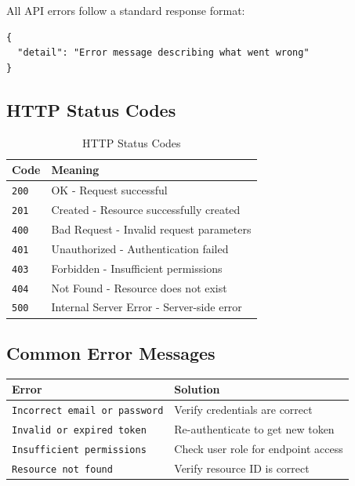 \documentclass[12pt,a4paper,oneside]{article}
\begin{document}
All API errors follow a standard response format:

\begin{lstlisting}
{
  "detail": "Error message describing what went wrong"
}
\end{lstlisting}

\subsection{HTTP Status Codes}

\begin{table}[H]
\centering
\begin{tabular}{|l|l|}
\hline
\textbf{Code} & \textbf{Meaning} \\
\hline
\texttt{200} & OK - Request successful \\
\texttt{201} & Created - Resource successfully created \\
\texttt{400} & Bad Request - Invalid request parameters \\
\texttt{401} & Unauthorized - Authentication failed \\
\texttt{403} & Forbidden - Insufficient permissions \\
\texttt{404} & Not Found - Resource does not exist \\
\texttt{500} & Internal Server Error - Server-side error \\
\hline
\end{tabular}
\caption{HTTP Status Codes}
\end{table}

\subsection{Common Error Messages}

\begin{table}[H]
\centering
\begin{tabular}{|l|l|}
\hline
\textbf{Error} & \textbf{Solution} \\
\hline
\texttt{Incorrect email or password} & Verify credentials are correct \\
\hline
\texttt{Invalid or expired token} & Re-authenticate to get new token \\
\hline
\texttt{Insufficient permissions} & Check user role for endpoint access \\
\hline
\texttt{Resource not found} & Verify resource ID is correct \\
\hline
\end{tabular}
\end{table}
\end{document}
